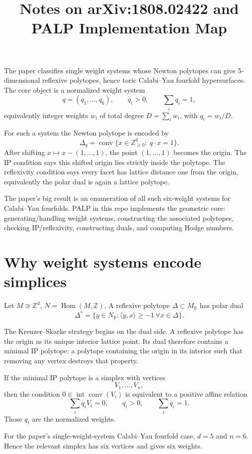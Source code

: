\documentclass[11pt]{article}
\title{Notes on arXiv:1808.02422 and PALP Implementation Map}
\author{}
\date{}
\begin{document}
\maketitle

The paper classifies single weight systems whose Newton polytopes can give 5-dimensional reflexive polytopes, hence toric Calabi--Yau fourfold hypersurfaces. The core object is a normalized weight system
\[
q=(q_1,\dots,q_6),\qquad q_i>0,\qquad \sum_i q_i=1,
\]
equivalently integer weights \(w_i\) of total degree \(D=\sum_i w_i\), with \(q_i=w_i/D\).

For such a system the Newton polytope is encoded by
\[
\Delta_q=\operatorname{conv}\{x\in\mathbb Z_{\ge0}^6:\ q\cdot x=1\}.
\]
After shifting \(x\mapsto x-(1,\dots,1)\), the point \((1,\dots,1)\) becomes the origin. The IP condition says this shifted origin lies strictly inside the polytope. The reflexivity condition says every facet has lattice distance one from the origin, equivalently the polar dual is again a lattice polytope.

The paper's big result is an enumeration of all such six-weight systems for Calabi--Yau fourfolds. PALP in this repo implements the geometric core: generating/handling weight systems, constructing the associated polytopes, checking IP/reflexivity, constructing duals, and computing Hodge numbers.

\section{Why weight systems encode simplices}

Let \(M\cong\mathbb Z^d\), \(N=\operatorname{Hom}(M,\mathbb Z)\). A reflexive polytope \(\Delta\subset M_\mathbb R\) has polar dual
\[
\Delta^*=\{y\in N_\mathbb R:\langle y,x\rangle\ge -1\ \forall x\in\Delta\}.
\]

The Kreuzer--Skarke strategy begins on the dual side. A reflexive polytope has the origin as its unique interior lattice point. Its dual therefore contains a minimal IP polytope: a polytope containing the origin in its interior such that removing any vertex destroys that property.

If the minimal IP polytope is a simplex with vertices
\[
V_1,\dots,V_n,
\]
then the condition \(0\in\operatorname{int}\operatorname{conv}(V_i)\) is equivalent to a positive affine relation
\[
\sum_i q_i V_i=0,\qquad q_i>0,\qquad \sum_i q_i=1.
\]
Those \(q_i\) are the normalized weights.

For the paper's single-weight-system Calabi--Yau fourfold case, \(d=5\) and \(n=6\). Hence the relevant simplex has six vertices and gives six weights.
\end{document}

